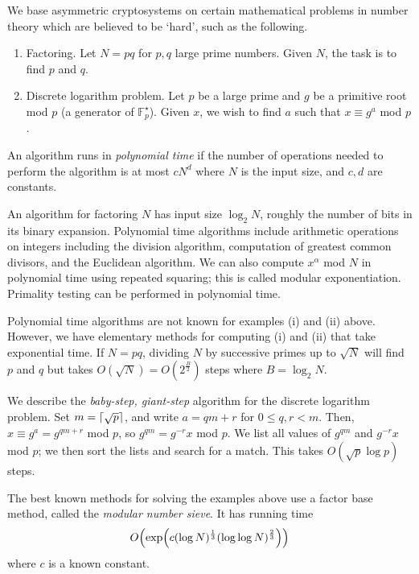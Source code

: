 We base asymmetric cryptosystems on certain mathematical problems in number theory which are believed to be `hard', such as the following.
\begin{enumerate}
    \item Factoring.
    Let \( N = pq \) for \( p, q \) large prime numbers.
    Given \( N \), the task is to find \( p \) and \( q \).
    \item Discrete logarithm problem.
    Let \( p \) be a large prime and \( g \) be a primitive root mod \( p \) (a generator of \( \mathbb F_p^\star \)).
    Given \( x \), we wish to find \( a \) such that \( x \equiv g^a \) mod \( p \).
\end{enumerate}
\begin{definition}
    An algorithm runs in \emph{polynomial time} if the number of operations needed to perform the algorithm is at most \( c N^d \) where \( N \) is the input size, and \( c, d \) are constants.
\end{definition}
\begin{example}
    An algorithm for factoring \( N \) has input size \( \log_2 N \), roughly the number of bits in its binary expansion.
    Polynomial time algorithms include arithmetic operations on integers including the division algorithm, computation of greatest common divisors, and the Euclidean algorithm.
    We can also compute \( x^\alpha \) mod \( N \) in polynomial time using repeated squaring; this is called modular exponentiation.
    Primality testing can be performed in polynomial time.

    Polynomial time algorithms are not known for examples (i) and (ii) above.
    However, we have elementary methods for computing (i) and (ii) that take exponential time.
    If \( N = pq \), dividing \( N \) by successive primes up to \( \sqrt{N} \) will find \( p \) and \( q \) but takes \( O(\sqrt{N}) = O(2^{\frac{B}{2}}) \) steps where \( B = \log_2 N \).
    
    We describe the \emph{baby-step, giant-step} algorithm for the discrete logarithm problem.
    Set \( m = \lceil\sqrt{p}\rceil \), and write \( a = qm + r \) for \( 0 \leq q, r < m \).
    Then, \( x \equiv g^a = g^{qm + r} \) mod \( p \), so \( g^{qm} = g^{-r} x \) mod \( p \).
    We list all values of \( g^{qm} \) and \( g^{-r}x \) mod \( p \); we then sort the lists and search for a match.
    This takes \( O(\sqrt{p}\log p) \) steps.

    The best known methods for solving the examples above use a factor base method, called the \emph{modular number sieve}.
    It has running time
    \[ O\qty(\exp(c (\log N)^{\frac{1}{3}} (\log \log N)^{\frac{2}{3}})) \]
    where \( c \) is a known constant.
\end{example}

